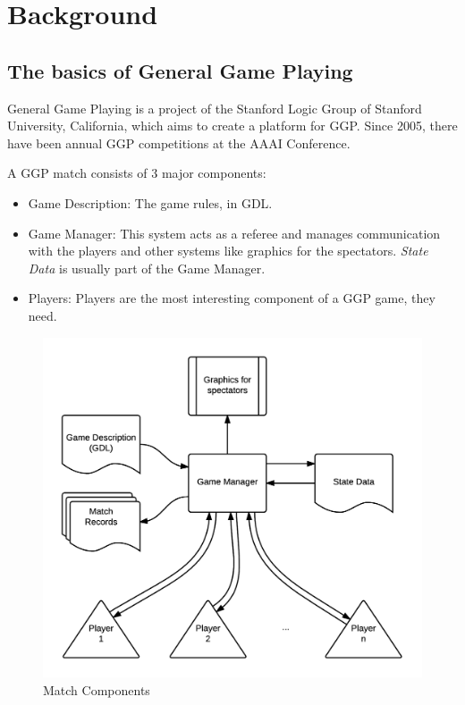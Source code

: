 
\chapter{Background}
\label{chapter:background}

\section{The basics of General Game Playing}

General Game Playing is a project of the Stanford Logic Group of Stanford University, California, which aims to create a platform for \gls{GGP}.
Since 2005, there have been annual \gls{GGP} competitions at the AAAI Conference.

A \gls{GGP} match consists of 3 major components:
\begin{itemize}
\item Game Description: The game rules, in \gls{GDL}.

\item Game Manager: This system acts as a referee and manages communication with the players and other systems like graphics for the spectators. \textit{State Data} is usually part of the Game Manager.

\item Players: Players are the most interesting component of a \gls{GGP} game, they need.

\end{itemize}

\begin{figure}[h]
	\centering
    \includegraphics[scale=0.8]{images/GGPgamesetup.png}
    \caption{Match Components}
    \label{fig:match components}
\end{figure}

